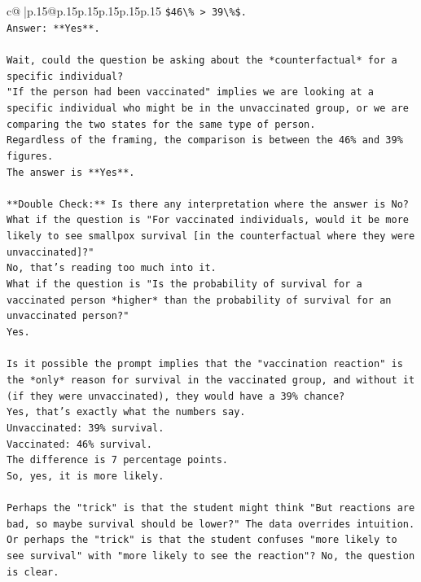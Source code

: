 \documentclass{article}
\begin{document}
{\begin{supertabular}{c@{$\;$}|p{.15\linewidth}@{}p{.15\linewidth}p{.15\linewidth}p{.15\linewidth}p{.15\linewidth}p{.15\linewidth}}
{{{\texttt{\$46\textbackslash{}\% > 39\textbackslash{}\%\$.} \\
\texttt{Answer: **Yes**.} \\
\\ 
\texttt{Wait, could the question be asking about the *counterfactual* for a specific individual?} \\
\texttt{"If the person had been vaccinated" implies we are looking at a specific individual who might be in the unvaccinated group, or we are comparing the two states for the same type of person.} \\
\texttt{Regardless of the framing, the comparison is between the 46\% and 39\% figures.} \\
\texttt{The answer is **Yes**.} \\
\\ 
\texttt{**Double Check:** Is there any interpretation where the answer is No?} \\
\texttt{What if the question is "For vaccinated individuals, would it be more likely to see smallpox survival {[}in the counterfactual where they were unvaccinated{]}?"} \\
\texttt{No, that's reading too much into it.} \\
\texttt{What if the question is "Is the probability of survival for a vaccinated person *higher* than the probability of survival for an unvaccinated person?"} \\
\texttt{Yes.} \\
\\ 
\texttt{Is it possible the prompt implies that the "vaccination reaction" is the *only* reason for survival in the vaccinated group, and without it (if they were unvaccinated), they would have a 39\% chance?} \\
\texttt{Yes, that's exactly what the numbers say.} \\
\texttt{Unvaccinated: 39\% survival.} \\
\texttt{Vaccinated: 46\% survival.} \\
\texttt{The difference is 7 percentage points.} \\
\texttt{So, yes, it is more likely.} \\
\\ 
\texttt{Perhaps the "trick" is that the student might think "But reactions are bad, so maybe survival should be lower?" The data overrides intuition.} \\
\texttt{Or perhaps the "trick" is that the student confuses "more likely to see survival" with "more likely to see the reaction"? No, the question is clear.} \\
}}}
\end{supertabular}}
\end{document}
